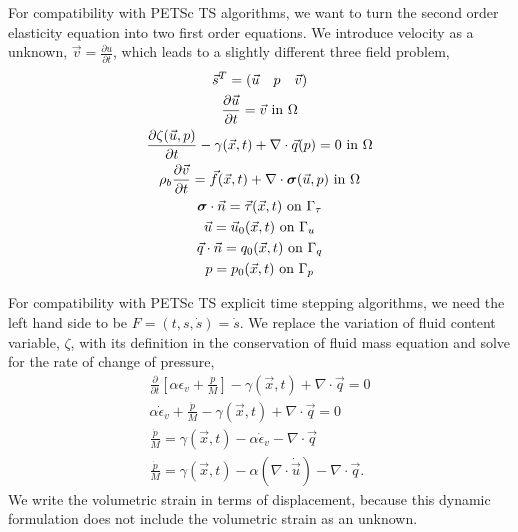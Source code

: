 For compatibility with PETSc TS algorithms, we want to turn the second
order elasticity equation into two first order equations. We introduce
velocity as a unknown, $\vec{v}=\frac{\partial u}{\partial t}$, which
leads to a slightly different three field problem,
\begin{gather}
\vec{s}^{T} = \left(\vec{u} \quad p \quad \vec{v}\right) \\
\frac{\partial \vec{u}}{\partial t} = \vec{v} \text{ in } \Omega \\
\frac{\partial \zeta(\vec{u},p)}{\partial t } - \gamma(\vec{x},t) + \nabla \cdot \vec{q}(p) = 0 \text{ in } \Omega \\
\rho_{b} \frac{\partial \vec{v}}{\partial t} = \vec{f}(\vec{x},t) + \nabla \cdot \bm{\sigma}(\vec{u},p) \text{ in } \Omega \\
\bm{\sigma} \cdot \vec{n} = \vec{\tau}(\vec{x},t) \text{ on } \Gamma_{\tau} \\
\vec{u} = \vec{u}_{0}(\vec{x}, t) \text{ on } \Gamma_{u} \\
\vec{q} \cdot \vec{n} = q_{0}(\vec{x}, t) \text{ on } \Gamma_{q} \\
p = p_{0}(\vec{x},t) \text{ on } \Gamma_{p}
\end{gather}

For compatibility with PETSc TS explicit time stepping algorithms, we
need the left hand side to be $F = (t,s,\dot{s}) = \dot{s}$. We
replace the variation of fluid content variable, $\zeta$, with its
definition in the conservation of fluid mass equation and solve for
the rate of change of pressure,
\begin{gather}
    \frac{\partial}{\partial t}\left[\alpha \epsilon_{v} + \frac{p}{M}\right] - \gamma\left(\vec{x},t\right) + \nabla \cdot \vec{q} = 0 \\
    \alpha \dot{\epsilon}_{v} + \frac{\dot{p}}{M} - \gamma \left(\vec{x},t\right) + \nabla \cdot \vec{q} = 0 \\
    \frac{\dot{p}}{M} = \gamma \left(\vec{x},t \right) - \alpha \dot{\epsilon}_{v} -\nabla \cdot \vec{q} \\
    \frac{\dot{p}}{M} = \gamma \left(\vec{x},t \right) - \alpha \left( \nabla \cdot \dot{\vec{u}} \right) -\nabla \cdot \vec{q}.
\end{gather}
We write the volumetric strain in terms of displacement, because this
dynamic formulation does not include the volumetric strain as an
unknown.

